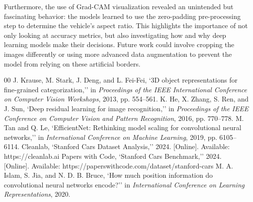 \documentclass[conference]{IEEEtran}
\begin{document}
Furthermore, the use of Grad-CAM visualization revealed an unintended but fascinating behavior: the models learned to use the zero-padding pre-processing step to determine the vehicle's aspect ratio. This highlights the importance of not only looking at accuracy metrics, but also investigating how and why deep learning models make their decisions. Future work could involve cropping the images differently or using more advanced data augmentation to prevent the model from relying on these artificial borders.

\begin{thebibliography}{00}
 J. Krause, M. Stark, J. Deng, and L. Fei-Fei, `3D object representations for fine-grained categorization,'' in \textit{Proceedings of the IEEE International Conference on Computer Vision Workshops}, 2013, pp. 554--561.
 K. He, X. Zhang, S. Ren, and J. Sun, `Deep residual learning for image recognition,'' in \textit{Proceedings of the IEEE Conference on Computer Vision and Pattern Recognition}, 2016, pp. 770--778.
 M. Tan and Q. Le, `EfficientNet: Rethinking model scaling for convolutional neural networks,'' in \textit{International Conference on Machine Learning}, 2019, pp. 6105--6114.
 Cleanlab, `Stanford Cars Dataset Analysis,'' 2024. [Online]. Available: https://cleanlab.ai
 Papers with Code, `Stanford Cars Benchmark,'' 2024. [Online]. Available: https://paperswithcode.com/dataset/stanford-cars
 M. A. Islam, S. Jia, and N. D. B. Bruce, `How much position information do convolutional neural networks encode?'' in \textit{International Conference on Learning Representations}, 2020.
\end{thebibliography}
\end{document}
